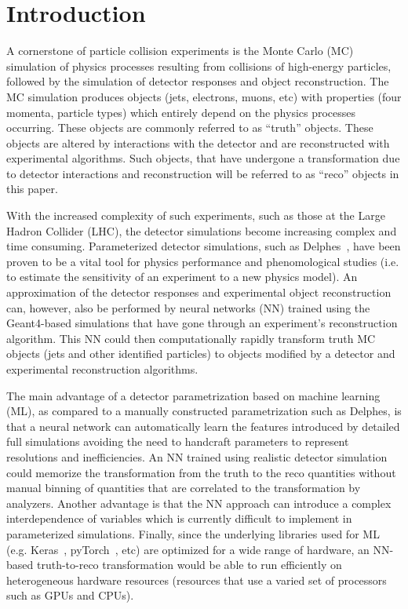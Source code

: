 \documentclass[showpacs,showkeys,preprint,prd,nofootinbib,linenumbers,12pt,superscriptaddress]{revtex4-1}
\begin{document}
\maketitle

\section{Introduction}

A cornerstone of particle collision experiments is the Monte Carlo (MC) simulation of physics processes resulting from collisions of high-energy particles, followed by the simulation of detector responses and object reconstruction. The MC simulation produces objects (jets, electrons, muons, etc) with properties (four momenta, particle types) which entirely depend on the physics processes occurring. These objects are commonly referred to as ``truth'' objects. These objects are altered by interactions with the detector and are reconstructed with experimental algorithms. Such objects, that have undergone a transformation due to detector interactions and reconstruction will be referred to as ``reco'' objects in this paper.

With the increased complexity of such experiments, such as those at the Large Hadron Collider (LHC), the detector simulations become increasing complex and time consuming. Parameterized detector simulations, such as Delphes~\cite{deFavereau:2013fsa}, have been proven to be a vital tool for physics performance and phenomological studies (i.e. to estimate the sensitivity of an experiment to a new physics model). An approximation of the detector responses and experimental object reconstruction can, however, also be performed by neural networks (NN) trained using the Geant4-based simulations that have gone through an experiment's reconstruction algorithm. This NN could then computationally rapidly transform truth MC objects (jets and other identified particles) to objects modified by a detector and experimental reconstruction algorithms.  

The main advantage of a detector parametrization based on machine learning (ML), as compared to a manually constructed parametrization such as Delphes, is that a neural network can automatically learn the features introduced by detailed full simulations avoiding the need to handcraft parameters to represent resolutions and inefficiencies. An NN trained using realistic detector simulation could memorize the transformation from the truth to the reco quantities without manual binning of quantities that are correlated to the transformation by analyzers. Another advantage is that the NN approach can introduce a complex interdependence of variables which is currently difficult to implement in parameterized simulations. Finally, since the underlying libraries used for ML (e.g. Keras~\cite{chollet2015keras}, pyTorch~\cite{NEURIPS2019_9015}, etc) are optimized for a wide range of hardware, an NN-based truth-to-reco transformation would be able to run efficiently on heterogeneous hardware resources (resources that use a varied set of processors such as GPUs and CPUs).
\end{document}
